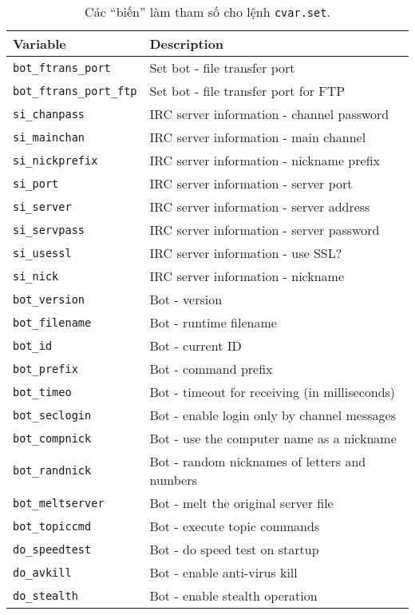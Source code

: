 \begin{table}[ht]
	\caption{Các ``biến'' làm tham số cho lệnh \texttt{cvar.set}.}\label{table:cvar_set}
	\centering
	\footnotesize
	\begin{tabular}{ll}\toprule
		\textbf{Variable} & \textbf{Description}\\\midrule
		\verb|bot_ftrans_port| & Set bot - file transfer port\\
		\verb|bot_ftrans_port_ftp| & Set bot - file transfer port for FTP\\
		\verb|si_chanpass| & IRC server information - channel password\\
		\verb|si_mainchan| & IRC server information - main channel\\
		\verb|si_nickprefix| & IRC server information - nickname prefix\\
		\verb|si_port| & IRC server information - server port\\
		\verb|si_server| & IRC server information - server address\\
		\verb|si_servpass| & IRC server information - server password\\
		\verb|si_usessl| & IRC server information - use SSL?\\
		\verb|si_nick| & IRC server information - nickname\\
		\verb|bot_version| & Bot - version\\
		\verb|bot_filename| & Bot - runtime filename\\
		\verb|bot_id| & Bot - current ID\\
		\verb|bot_prefix| & Bot - command prefix\\
		\verb|bot_timeo| & Bot - timeout for receiving (in milliseconds)\\
		\verb|bot_seclogin| & Bot - enable login only by channel messages\\
		\verb|bot_compnick| & Bot - use the computer name as a nickname\\
		\verb|bot_randnick| & Bot - random nicknames of letters and numbers\\
		\verb|bot_meltserver| & Bot - melt the original server file\\
		\verb|bot_topiccmd| & Bot - execute topic commands\\
		\verb|do_speedtest| & Bot - do speed test on startup\\
		\verb|do_avkill| & Bot - enable anti-virus kill\\
		\verb|do_stealth| & Bot - enable stealth operation\\

\end{tabular}
\end{table}
